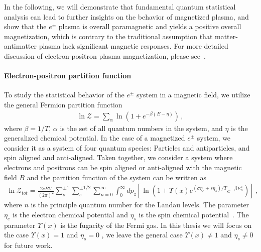 In the following,  we will demonstrate that fundamental quantum statistical analysis can lead to further insights on the behavior of magnetized plasma, and show that the $e^\pm$ plasma is overall paramagnetic and yields a positive overall magnetization, which
is contrary to the traditional assumption that matter-antimatter plasma lack significant magnetic responses. For more detailed discussion  of electron-positron plasma magnetization, please see~\cite{Andrew:2023abc}.



\paragraph{Electron-positron partition function}
To study the statistical behavior of the $e^\pm$ system in a magnetic field, we utilize the general Fermion partition function~\cite{Elze:1980er}
\begin{align}
 \label{PartFunc} \ln\mathcal{Z}=\sum_{\alpha}\ln\left(1+e^{-\beta(E-\eta)}\right)\,,
\end{align}
where $\beta=1/T$, $\alpha$ is the set of all quantum numbers in the system, and $\eta$ is the generalized chemical potential. In the case of a magnetized $e^{\pm}$ system, we consider it as a system of four quantum species: Particles and antiparticles, and spin aligned and anti-aligned. Taken together, we consider a system where electrons and positrons can be spin aligned or anti-aligned with the magnetic field $B$ and the partition function of the system can be written as
\begin{align}\label{PartFuncB}
\ln\mathcal{Z}_{tot}=\frac{2eBV}{(2\pi)^2}\sum_{\sigma}^{\pm1}\sum_{s}^{\pm1/2}\sum_{n=0}^\infty\int^\infty_{0}dp_z\left[\ln\left(1+\Upsilon(x)e^{(\sigma\eta_{e}+s\eta_s)/T}e^{-\beta E_{n}^{s}}\right)\right]\,,
\end{align}
where $n$ is the principle quantum number for the Landau levels. The parameter $\eta_{e}$ is the electron chemical potential and $\eta_s$ is the spin chemical potential~\cite{Andrew:2023abc}. The parameter $\Upsilon(x)$ is the fugacity of the Fermi gas. In this thesis we will focus on the case $\Upsilon(x)=1$ and $\eta_s=0$ , 
we leave the general case $\Upsilon(x)\neq1$ and $\eta_s\neq0$ for future work.



